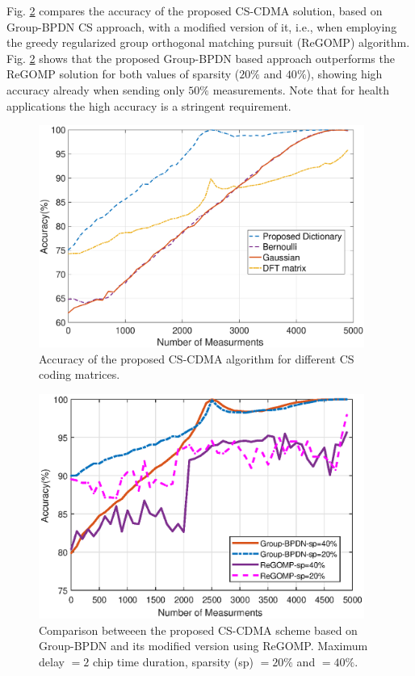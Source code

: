 Fig. \ref{Fig_result3} compares the accuracy of the proposed CS-CDMA solution, based on Group-BPDN CS approach, with a modified version of it, i.e., when employing the greedy regularized group orthogonal matching pursuit (ReGOMP) algorithm. Fig. \ref{Fig_result3} shows that the proposed Group-BPDN based approach outperforms the ReGOMP solution for both values of sparsity ($20 \%$ and $40 \%$), showing high accuracy already when sending only $50 \%$ measurements. Note that for health applications the high accuracy is a stringent requirement.

\begin{figure}
	\centering
	\includegraphics[width=0.95\textwidth]{figures/GC_beamforming/sen4sparsity-50-delay2-1.eps}
	\caption{Accuracy of the proposed CS-CDMA algorithm for different CS coding matrices.}	
	\label{Fig_result2}
\end{figure}
\begin{figure}
	\centering
	\includegraphics[width=0.95\textwidth]{figures/GC_beamforming/measuremDelay2sen4.eps}
	\caption{Comparison betweeen the proposed CS-CDMA scheme based on Group-BPDN and its modified version using ReGOMP. Maximum delay $= 2$ chip time duration, sparsity (sp) $= 20 \%$ and $= 40 \%$.}	
	\label{Fig_result3}
\end{figure}

